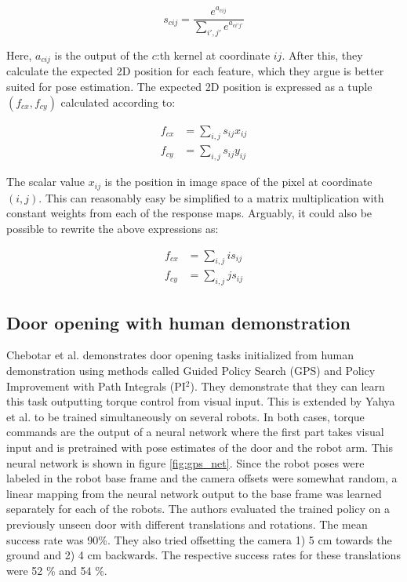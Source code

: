\begin{equation}
    s_{cij} = \frac{e^{a_{cij}}}{\sum_{i',j'} e^{a_{ci'j'}}}
\end{equation}

Here, $a_{cij}$ is the output of the $c$:th kernel at coordinate $ij$. After
this, they calculate the expected 2D position for each feature, which they
argue is better suited for pose estimation. The expected 2D position is
expressed as a tuple $(f_{cx}, f_{cy})$ calculated according to:

\begin{align}
    f_{cx} &= \sum_{i,j} s_{ij} x_{ij} \\
    f_{cy} &= \sum_{i,j} s_{ij} y_{ij}
\end{align}

The scalar value $x_{ij}$ is the position in image space of the pixel at coordinate
$(i, j)$. This can reasonably easy be simplified to a matrix multiplication with constant
weights from each of the response maps. Arguably, it could also be possible to rewrite the
above expressions as:

\begin{align}
    f_{cx} &= \sum_{i,j} i s_{ij} \\
    f_{cy} &= \sum_{i,j} j s_{ij}
\end{align}

\subsection{Door opening with human demonstration}

Chebotar et al. \cite{chebotar2016path} demonstrates door opening tasks
initialized from human demonstration using methods called Guided Policy Search
(GPS) and Policy Improvement with Path Integrals (PI$^2$). They demonstrate
that they can learn this task outputting torque control from visual input. This is
extended by Yahya et al. \cite{yahya2016collective} to be trained
simultaneously on several robots. In both cases, torque commands are the output
of a neural network where the first part takes visual input and is pretrained
with pose estimates of the door and the robot arm. This neural network is shown
in figure \ref{fig:gps_net}. Since the robot poses were labeled in the robot
base frame and the camera offsets were somewhat random, a linear mapping from
the neural network output to the base frame was learned separately for each of
the robots. The authors evaluated the trained policy on a previously unseen
door with different translations and rotations. The mean success rate was
90\%. They also tried offsetting the camera 1) 5 cm towards the ground and 2) 4
cm backwards. The respective success rates for these translations were 52 \%
and 54 \%.

